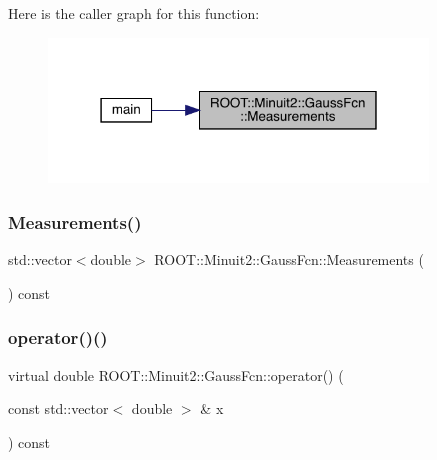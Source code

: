 Here is the caller graph for this function\+:
\nopagebreak
\begin{figure}[H]
\begin{center}
\leavevmode
\includegraphics[width=286pt]{de/dc1/classROOT_1_1Minuit2_1_1GaussFcn_a61ee040fbdb752b6629de59b8b512cf5_icgraph}
\end{center}
\end{figure}
\mbox{\label{classROOT_1_1Minuit2_1_1GaussFcn_a61ee040fbdb752b6629de59b8b512cf5}} 
\subsubsection{\texorpdfstring{Measurements()}{Measurements()}\hspace{0.1cm}{\footnotesize\ttfamily [2/2]}}
{\footnotesize\ttfamily std\+::vector$<$double$>$ R\+O\+O\+T\+::\+Minuit2\+::\+Gauss\+Fcn\+::\+Measurements (\begin{DoxyParamCaption}{ }\end{DoxyParamCaption}) const\hspace{0.3cm}{\ttfamily [inline]}}

\mbox{\label{classROOT_1_1Minuit2_1_1GaussFcn_a31e8417ee8733da39a19db774b5c92f9}} 
\subsubsection{\texorpdfstring{operator()()}{operator()()}\hspace{0.1cm}{\footnotesize\ttfamily [1/2]}}
{\footnotesize\ttfamily virtual double R\+O\+O\+T\+::\+Minuit2\+::\+Gauss\+Fcn\+::operator() (\begin{DoxyParamCaption}\item[{const std\+::vector$<$ double $>$ \&}]{x }\end{DoxyParamCaption}) const\hspace{0.3cm}{\ttfamily [virtual]}}


